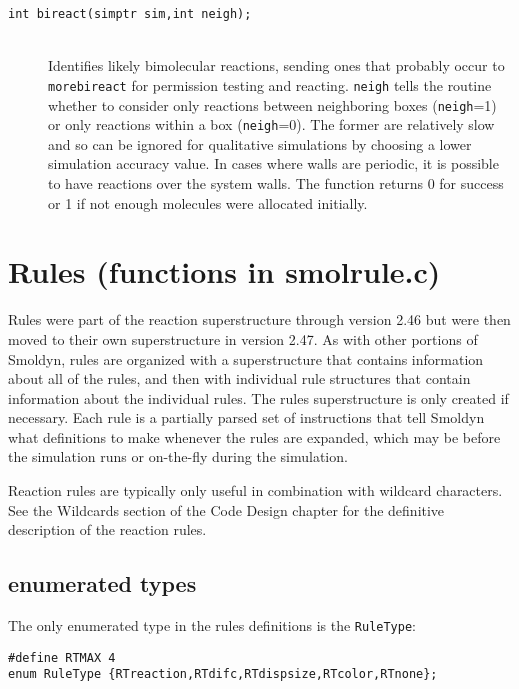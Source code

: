 \documentclass {book}
\newcommand {\ttt} {\texttt}
\begin{document}
\begin{description}
\item[\ttt{int bireact(simptr sim,int neigh);}]
\hfill \\
Identifies likely bimolecular reactions, sending ones that probably occur to \ttt{morebireact} for permission testing and reacting. \ttt{neigh} tells the routine whether to consider only reactions between neighboring boxes (\ttt{neigh}=1) or only reactions within a box (\ttt{neigh}=0). The former are relatively slow and so can be ignored for qualitative simulations by choosing a lower simulation accuracy value. In cases where walls are periodic, it is possible to have reactions over the system walls. The function returns 0 for success or 1 if not enough molecules were allocated initially.

\end{description}

\section{Rules (functions in smolrule.c)}

Rules were part of the reaction superstructure through version 2.46 but were then moved to their own superstructure in version 2.47. As with other portions of Smoldyn, rules are organized with a superstructure that contains information about all of the rules, and then with individual rule structures that contain information about the individual rules. The rules superstructure is only created if necessary. Each rule is a partially parsed set of instructions that tell Smoldyn what definitions to make whenever the rules are expanded, which may be before the simulation runs or on-the-fly during the simulation.

Reaction rules are typically only useful in combination with wildcard characters. See the Wildcards section of the Code Design chapter for the definitive description of the reaction rules.

\subsection*{enumerated types}

The only enumerated type in the rules definitions is the \ttt{RuleType}:

\begin{lstlisting}
#define RTMAX 4
enum RuleType {RTreaction,RTdifc,RTdispsize,RTcolor,RTnone};
\end{lstlisting}
\end{document}

